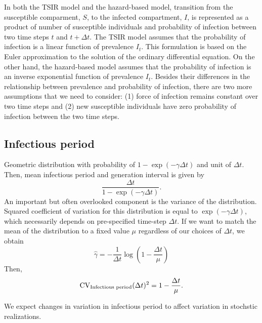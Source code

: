 \documentclass{article}
\begin{document}
In both the TSIR model and the hazard-based model, transition from the susceptible comparment, $S$, to the infected compartment, $I$, is represented as a product of number of susceptible individuals and probability of infection between two time steps $t$ and $t + \Delta t$.
The TSIR model assumes that the probability of infection is a linear function of prevalence $I_t$.
This formulation is based on the Euler approximation to the solution of the ordinary differential equation.
On the other hand, the hazard-based model assumes that the probability of infection is an inverse exponential function of prevalence $I_t$.
Besides their differences in the relationship between prevalence and probability of infection, there are two more assumptions that we need to consider: (1) force of infection remains constant over two time steps and (2) new susceptible individuals have zero probability of infection between the two time steps.



\subsection{Infectious period}

Geometric distribution with probability of $1-\exp(-\gamma \Delta t)$ and unit of $\Delta t$.
Then, mean infectious period and generation interval is given by 
\begin{equation}
\frac{\Delta t}{1-\exp(-\gamma \Delta t)}.
\end{equation}
An important but often overlooked component is the variance of the distribution.
Squared coefficient of variation for this distribution is equal to $\exp(-\gamma \Delta t)$, which necessarily depends on pre-specified time-step $\Delta t$.
If we want to match the mean of the distribution to a fixed value $\mu$ regardless of our choices of $\Delta t$, we obtain 
\begin{equation}
\hat \gamma = - \frac{1}{\Delta t} \log\left(1 - \frac{\Delta t}{\mu}\right)
\end{equation}
Then,
\begin{equation}
\mathrm{CV}_{\tiny\textrm{Infectious period}}(\Delta t)^2 = 1 - \frac{\Delta t}{\mu}.
\end{equation}

We expect changes in variation in infectious period to affect variation in stochstic realizations.
\end{document}
